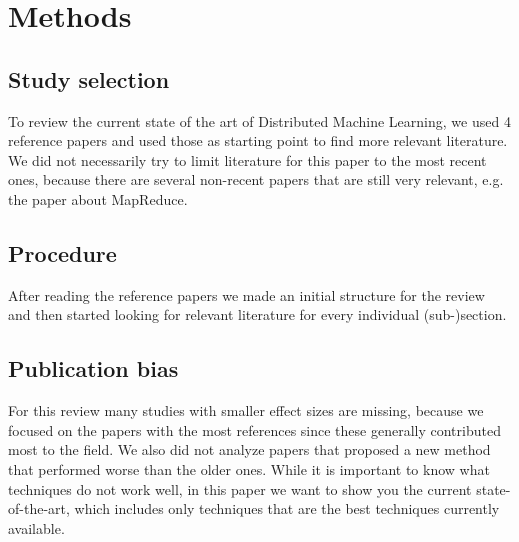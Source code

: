 \section{Methods}

\subsection{Study selection}
To review the current state of the art of Distributed Machine Learning, we used 4 reference papers\cite{Bal12}\cite{Die12}\cite{Xing16}\cite{Zhang16} and used those as starting point to find more relevant literature. We did not necessarily try to limit literature for this paper to the most recent ones, because there are several non-recent papers that are still very relevant, e.g. the paper about MapReduce\cite{Dean04}.
\subsection{Procedure}
After reading the reference papers \cite{Bal12}\cite{Die12}\cite{Xing16}\cite{Zhang16} we made an initial structure for the review and then started looking for relevant literature for every individual (sub-)section.
\subsection{Publication bias}
For this review many studies with smaller effect sizes are missing, because we focused on the papers with the most references since these generally contributed most to the field. We also did not analyze papers that proposed a new method that performed worse than the older ones. While it is important to know what techniques do not work well, in this paper we want to show you the current state-of-the-art, which includes only techniques that are the best techniques currently available.
